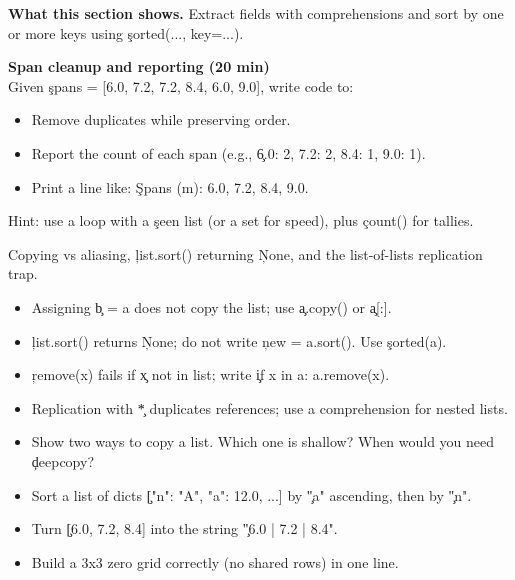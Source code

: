 
\begin{NoteBox}
\textbf{What this section shows.} Extract fields with comprehensions and sort by one or more keys using \c{sorted(..., key=...)}.
\end{NoteBox}

\begin{minilab}
\textbf{Span cleanup and reporting (20 min)}\\
Given \c{spans = [6.0, 7.2, 7.2, 8.4, 6.0, 9.0]}, write code to:
\begin{itemize}
  \item Remove duplicates while preserving order.
  \item Report the count of each span (e.g., \c{6.0: 2, 7.2: 2, 8.4: 1, 9.0: 1}).
  \item Print a line like: \c{Spans (m): 6.0, 7.2, 8.4, 9.0}.
\end{itemize}
Hint: use a loop with a \c{seen} list (or a set for speed), plus \c{count()} for tallies.
\end{minilab}

Copying vs aliasing, \c{list.sort()} returning \c{None}, and the list-of-lists replication trap.

\begin{itemize}
  \item Assigning \c{b = a} does not copy the list; use \c{a.copy()} or \c{a[:]}.
  \item \c{list.sort()} returns \c{None}; do not write \c{new = a.sort()}. Use \c{sorted(a)}.
  \item \c{remove(x)} fails if \c{x} not in list; write \c{if x in a: a.remove(x)}.
  \item Replication with \c{*} duplicates references; use a comprehension for nested lists.
\end{itemize}

\begin{itemize}
  \item Show two ways to copy a list. Which one is shallow? When would you need \c{deepcopy}?
  \item Sort a list of dicts \c{[{"n": "A", "a": 12.0}, ...]} by \c{"a"} ascending, then by \c{"n"}.
  \item Turn \c{[6.0, 7.2, 8.4]} into the string \c{"6.0 | 7.2 | 8.4"}.
  \item Build a 3x3 zero grid correctly (no shared rows) in one line.
\end{itemize}

